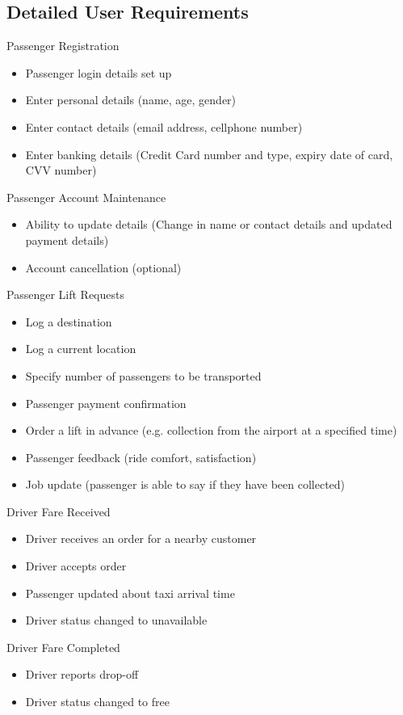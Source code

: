 \documentclass[10pt,twocolumn]{witseiepaper}
\begin{document}
\subsection{Detailed User Requirements}
Passenger Registration
\begin{itemize}
\item Passenger login details set up
\item Enter personal details (name, age, gender)
\item Enter contact details (email address, cellphone number)
\item Enter banking details (Credit Card number and type, expiry date of card, CVV number)
\end{itemize}
Passenger Account Maintenance
\begin{itemize}
\item Ability to update details (Change in name or contact details and updated payment details)
\item Account cancellation (optional)
\end{itemize}
Passenger Lift Requests
\begin{itemize}
\item Log a destination
\item Log a current location
\item Specify number of passengers to be transported
\item Passenger payment confirmation
\item Order a lift in advance (e.g. collection from the airport at a specified time) 
\item Passenger feedback (ride comfort, satisfaction)
\item Job update (passenger is able to say if they have been collected)
\end{itemize}
Driver Fare Received
\begin{itemize}
\item Driver receives an order for a nearby customer
\item Driver accepts order
\item Passenger updated about taxi arrival time
\item Driver status changed to unavailable
\end{itemize}
Driver  Fare Completed
\begin{itemize}
\item Driver reports drop-off
\item Driver status changed to free
\end{itemize}
\end{document}
